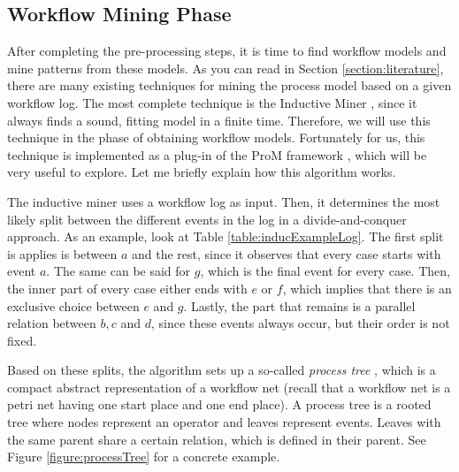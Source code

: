 \documentclass[a4paper,11pt]{article}
\begin{document}
\subsection{Workflow Mining Phase}
After completing the pre-processing steps, it is time to find workflow models and mine patterns from these models. As you can read in Section \ref{section:literature}, there are many existing techniques for mining the process model based on a given workflow log. The most complete technique is the Inductive Miner \cite{InductiveMiner2013}, since it always finds a sound, fitting model in a finite time. Therefore, we will use this technique in the phase of obtaining workflow models. Fortunately for us, this technique is implemented as a plug-in of the ProM framework \cite{InductiveVisualMiner2014}, which will be very useful to explore. Let me briefly explain how this algorithm works. 

The inductive miner uses a workflow log as input. Then, it determines the most likely split between the different events in the log in a divide-and-conquer approach. As an example, look at Table \ref{table:inducExampleLog}. The first split is applies is between $a$ and the rest, since it observes that every case starts with event $a$. The same can be said for $g$, which is the final event for every case. Then, the inner part of every case either ends with $e$ or $f$, which implies that there is an exclusive choice between $e$ and $g$. Lastly, the part that remains is a parallel relation between $b,c$ and $d$, since these events always occur, but their order is not fixed.

Based on these splits, the algorithm sets up a so-called \textit{process tree} \cite{Buijs2012}, which is a compact abstract representation of a workflow net (recall that a workflow net is a petri net having one start place and one end place). A process tree is a rooted tree where nodes represent an operator and leaves represent events. Leaves with the same parent share a certain relation, which is defined in their parent. See Figure \ref{figure:processTree} for a concrete example.
\end{document}
